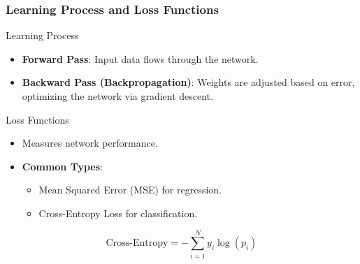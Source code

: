 \documentclass[aspectratio=169]{beamer}
\begin{document}
\begin{frame}[fragile]
    \frametitle{Learning Process and Loss Functions}
    
    \begin{block}{Learning Process}
        \begin{itemize}
            \item \textbf{Forward Pass}: Input data flows through the network.
            \item \textbf{Backward Pass (Backpropagation)}: Weights are adjusted based on error, optimizing the network via gradient descent.
        \end{itemize}
    \end{block}
    
    \begin{block}{Loss Functions}
        \begin{itemize}
            \item Measures network performance.
            \item \textbf{Common Types}:
            \begin{itemize}
                \item Mean Squared Error (MSE) for regression.
                \item Cross-Entropy Loss for classification.
            \end{itemize}
        \end{itemize}
        \begin{equation}
            \text{Cross-Entropy} = -\sum_{i=1}^{N} y_i \log(p_i)
        \end{equation}
    \end{block}
\end{frame}
\end{document}
